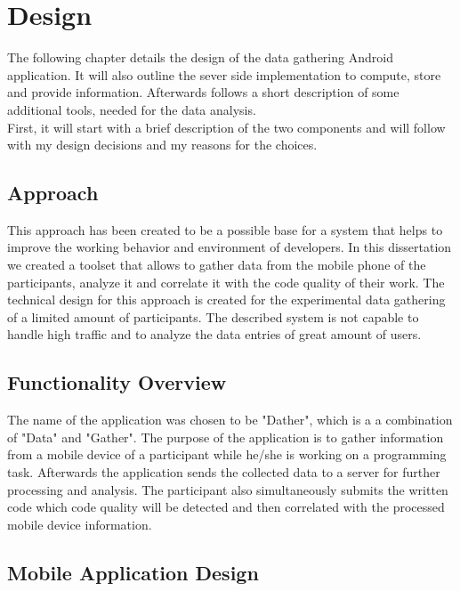 \chapter{Design}

\begin{flushleft}
The following chapter details the design of the data gathering Android application. It will also outline the sever side implementation to compute, store and provide information. Afterwards follows a short description of some additional tools, needed for the data analysis.\\
First, it will start with a brief description of the two components and will follow with my design decisions and my reasons for the choices. 
\end{flushleft}

\section{Approach}
This approach has been created to be a possible base for a system that helps to improve the working behavior and environment of developers. 
In this dissertation we created a toolset that allows to gather data from the mobile phone of the participants, analyze it and correlate it with the code quality of their work. The technical design for this approach is created for the experimental data gathering of a limited amount of participants. The described system is not capable to handle high traffic and to analyze the data entries of great amount of users. 

\section{Functionality Overview}
The name of the application was chosen to be "Dather", which is a a combination of "Data" and "Gather".
The purpose of the application is to gather information from a mobile device of a participant while he/she is working on a programming task. Afterwards the application sends the collected data to a server for further processing and analysis. The participant also simultaneously submits the written code which code quality will be detected and then correlated with the processed mobile device information. 

\section{Mobile Application Design}

